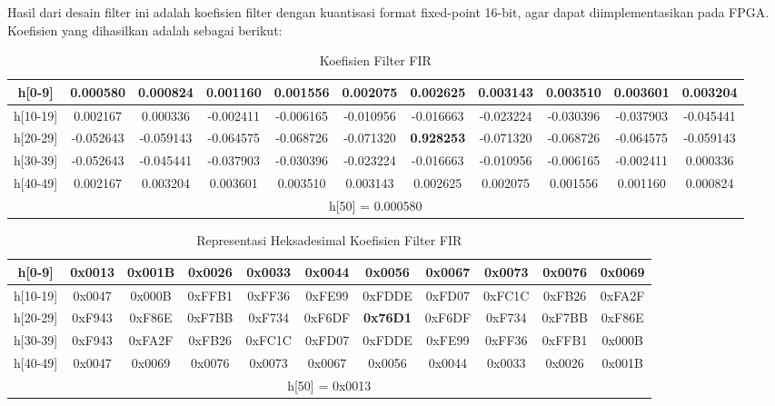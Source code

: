 \documentclass{article}
\begin{document}
Hasil dari desain filter ini adalah koefisien filter dengan kuantisasi format fixed-point 16-bit,
agar dapat diimplementasikan pada FPGA. Koefisien yang dihasilkan adalah sebagai berikut:
\begin{table}[H]
  \centering
  \footnotesize
  \begin{tabular}{|c|c|c|c|c|c|c|c|c|c|c|}
    \hline
    h[0-9] & 0.000580 & 0.000824 & 0.001160 & 0.001556 & 0.002075 & 0.002625 & 0.003143 & 0.003510 & 0.003601 & 0.003204 \\
    \hline
    h[10-19] & 0.002167 & 0.000336 & -0.002411 & -0.006165 & -0.010956 & -0.016663 & -0.023224 & -0.030396 & -0.037903 & -0.045441 \\
    \hline
    h[20-29] & -0.052643 & -0.059143 & -0.064575 & -0.068726 & -0.071320 & \textbf{0.928253} & -0.071320 & -0.068726 & -0.064575 & -0.059143 \\
    \hline
    h[30-39] & -0.052643 & -0.045441 & -0.037903 & -0.030396 & -0.023224 & -0.016663 & -0.010956 & -0.006165 & -0.002411 & 0.000336 \\
    \hline
    h[40-49] & 0.002167 & 0.003204 & 0.003601 & 0.003510 & 0.003143 & 0.002625 & 0.002075 & 0.001556 & 0.001160 & 0.000824 \\
    \multicolumn{11}{|c|}{h[50] = 0.000580} \\
    \hline
  \end{tabular}

  \caption{Koefisien Filter FIR}
  \label{tab:fir_coeffs}
\end{table}
\begin{table}[H]
  \centering
  \footnotesize
  \begin{tabular}{|c|c|c|c|c|c|c|c|c|c|c|}
    \hline
    h[0-9] & 0x0013 & 0x001B & 0x0026 & 0x0033 & 0x0044 & 0x0056 & 0x0067 & 0x0073 & 0x0076 & 0x0069 \\
    \hline
    h[10-19] & 0x0047 & 0x000B & 0xFFB1 & 0xFF36 & 0xFE99 & 0xFDDE & 0xFD07 & 0xFC1C & 0xFB26 & 0xFA2F \\
    \hline
    h[20-29] & 0xF943 & 0xF86E & 0xF7BB & 0xF734 & 0xF6DF & \textbf{0x76D1} & 0xF6DF & 0xF734 & 0xF7BB & 0xF86E \\
    \hline
    h[30-39] & 0xF943 & 0xFA2F & 0xFB26 & 0xFC1C & 0xFD07 & 0xFDDE & 0xFE99 & 0xFF36 & 0xFFB1 & 0x000B \\
    \hline
    h[40-49] & 0x0047 & 0x0069 & 0x0076 & 0x0073 & 0x0067 & 0x0056 & 0x0044 & 0x0033 & 0x0026 & 0x001B \\
    \multicolumn{11}{|c|}{h[50] = 0x0013} \\
    \hline
  \end{tabular}
  \caption{Representasi Heksadesimal Koefisien Filter FIR}
  \label{tab:fir_coeffs_hex}
\end{table}
\end{document}
